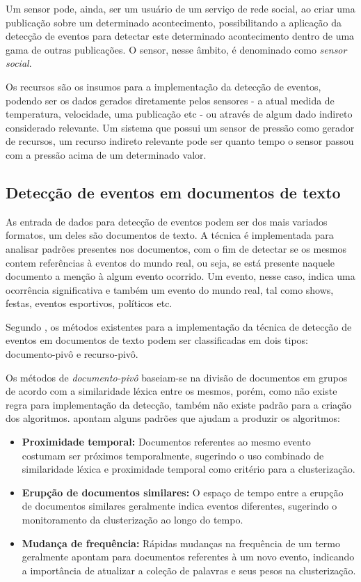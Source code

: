 Um sensor pode, ainda, ser um usuário de um serviço de rede social, ao criar uma publicação sobre um determinado acontecimento, possibilitando a aplicação da detecção de eventos para detectar este determinado acontecimento dentro de uma gama de outras publicações. O sensor, nesse âmbito, é denominado como \textit{sensor social}.

Os recursos são os insumos para a implementação da detecção de eventos, podendo ser os dados gerados diretamente pelos sensores - a atual medida de temperatura, velocidade, uma publicação etc - ou através de algum dado indireto considerado relevante. Um sistema que possui um sensor de pressão como gerador de recursos, um recurso indireto relevante pode ser quanto tempo o sensor passou com a pressão acima de um determinado valor.

\subsection{Detecção de eventos em documentos de texto}

As entrada de dados para detecção de eventos podem ser dos mais variados formatos, um deles são documentos de texto. A técnica é implementada para analisar padrões presentes nos documentos, com o fim de detectar se os mesmos contem referências à eventos do mundo real, ou seja, se está presente naquele documento a menção à algum evento ocorrido. Um evento, nesse caso, indica uma ocorrência significativa e também um evento do mundo real, tal como shows, festas, eventos esportivos, políticos etc.

Segundo , os métodos existentes para a implementação da técnica de detecção de eventos em documentos de texto podem ser classificadas em dois tipos: documento-pivô e recurso-pivô. 

Os métodos de \textit{documento-pivô} baseiam-se na divisão de documentos em grupos de acordo com a similaridade léxica entre os mesmos, porém, como não existe regra para implementação da detecção, também não existe padrão para a criação dos algoritmos.  apontam alguns padrões que ajudam a produzir os algoritmos:

\begin{itemize}
	\item \textbf{Proximidade temporal:} Documentos referentes ao mesmo evento costumam ser próximos temporalmente, sugerindo o uso combinado de similaridade léxica e proximidade temporal como critério para a clusterização.
	\item \textbf{Erupção de documentos similares:} O espaço de tempo entre a erupção de documentos similares geralmente indica eventos diferentes, sugerindo o monitoramento da clusterização ao longo do tempo.
	\item \textbf{Mudança de frequência:} Rápidas mudanças na frequência de um termo geralmente apontam para documentos referentes à um novo evento, indicando a importância de atualizar a coleção de palavras e seus pesos na clusterização.
\end{itemize}

